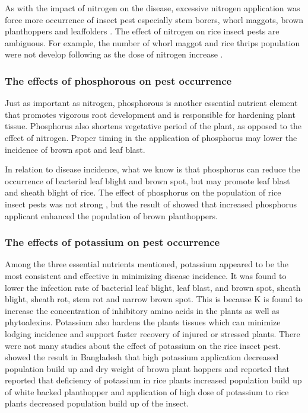 \documentclass[12pt, oneside]{report}
\begin{document}
As with the impact of nitrogen on the disease, excessive nitrogen application was force more occurrence of insect pest especially stem borers, whorl maggots, brown planthoppers and leaffolders \citep{chau2003impacts, litsinger2011cultural, rashid2014effect}. The effect of nitrogen on rice insect pests are ambiguous. For example, the number of whorl maggot and rice thrips population were not develop following as the dose of nitrogen increase \citep{chau2003impacts}.

\subsubsection{The effects of phosphorous on pest occurrence}

Just as important as nitrogen, phosphorous is another essential nutrient element that promotes vigorous root development and is responsible for hardening plant tissue. Phosphorus also shortens vegetative period of the plant, as opposed to the effect of nitrogen. Proper timing in the application of phosphorus may lower the incidence of brown spot and leaf blast. 

In relation to disease incidence, what we know is that phosphorus can reduce the occurrence of bacterial leaf blight and brown spot, but may promote leaf blast and sheath blight of rice. The effect of phosphorus on the population of rice insect pests was not strong \citep{chau2003impacts, rashid2014effect}, but the result of \cite{rashid2014effect} showed that increased phosphorus applicant enhanced the population of brown planthoppers.

\subsubsection{The effects of potassium on pest occurrence}

Among the three essential nutrients mentioned, potassium appeared to be the most consistent and effective in minimizing disease incidence. It was found to lower the infection rate of bacterial leaf blight, leaf blast, and brown spot, sheath blight, sheath rot, stem rot and narrow brown spot. This is because K is found to increase the concentration of inhibitory amino acids in the plants as well as phytoalexins. Potassium also hardens the plants tissues which can minimize lodging incidence and support faster recovery of injured or stressed plants. There were not many studies about the effect of potassium on the rice insect pest. \cite{rashid2014effect} showed the result in Bangladesh that high potassium application decreased population build up and dry weight of brown plant hoppers and \cite{salim2002effects} reported that reported that deficiency of potassium in rice plants increased population build up of white backed planthopper and application of high dose of potassium to rice plants decreased population build up of the insect.
\end{document}
